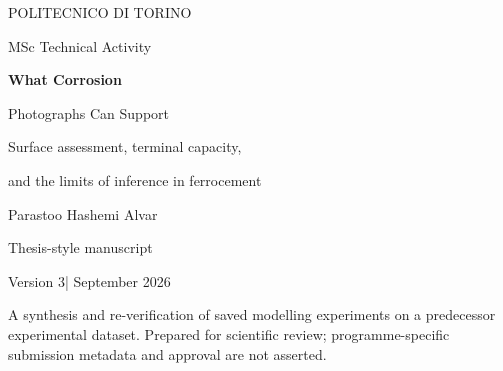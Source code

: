 \documentclass[11pt,a4paper,oneside]{report}
\newcommand{\shared}{../..}
\newcommand{\draftversion}{Version 3}
\begin{document}
\hypersetup{pageanchor=false}
\begin{titlepage}
\centering
{\large POLITECNICO DI TORINO\par}\vspace{24mm}
{\large MSc Technical Activity\par}\vspace{8mm}
{\Huge\bfseries What Corrosion\par Photographs Can Support\par}\vspace{9mm}
{\Large Surface assessment, terminal capacity,\par and the limits of inference in ferrocement\par}\vspace{21mm}
{\Large Parastoo Hashemi Alvar\par}\vfill
{\large Thesis-style manuscript\par}\vspace{3mm}
{\draftversion\quad | September 2026\par}\vspace{8mm}
\begin{minipage}{.8\textwidth}\small\centering
A synthesis and re-verification of saved modelling experiments on a predecessor experimental dataset. Prepared for scientific review; programme-specific submission metadata and approval are not asserted.
\end{minipage}
\end{titlepage}
\hypersetup{pageanchor=true}

{\small\setlength{\parskip}{0pt}\tableofcontents}
\clearpage
\listoffigures
\clearpage
\listoftables
\clearpage{}










\appendix



\end{document}
